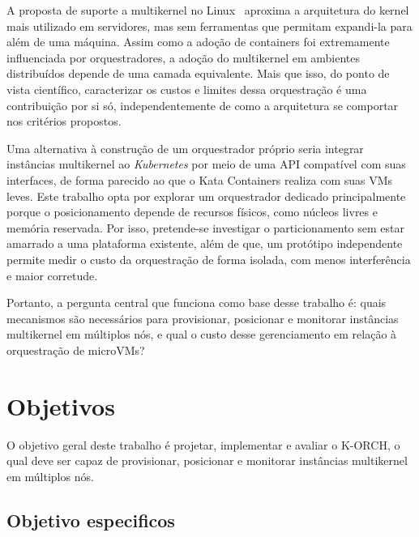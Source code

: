 \documentclass[12pt]{article}
\begin{document}
A proposta de suporte a multikernel no Linux~\cite{wang2025multikernel} aproxima a arquitetura
do kernel mais utilizado em servidores, mas sem ferramentas que permitam expandi-la para além de uma máquina.
Assim como a adoção de containers foi extremamente influenciada por orquestradores, a adoção do multikernel em ambientes distribuídos depende de uma
camada equivalente.
Mais que isso, do ponto de vista científico, caracterizar os custos e limites dessa orquestração é uma contribuição
por si só, independentemente de como a arquitetura se comportar nos critérios propostos.

Uma alternativa à construção de um orquestrador próprio seria integrar instâncias multikernel ao \textit{Kubernetes} por meio
de uma API compatível com suas interfaces, de forma parecido ao que o Kata Containers realiza com suas VMs leves.
Este trabalho opta por explorar um orquestrador dedicado principalmente porque o posicionamento depende de recursos físicos, como núcleos livres e
memória reservada.
Por isso, pretende-se investigar o particionamento sem estar amarrado a uma plataforma existente, além de que, um protótipo independente permite
medir o custo da orquestração de forma isolada, com menos interferência e maior corretude.

Portanto, a pergunta central que funciona como base desse trabalho é: quais mecanismos são necessários para provisionar, posicionar e monitorar instâncias multikernel
em múltiplos nós, e qual o custo desse gerenciamento em relação à orquestração de microVMs?

\section{Objetivos} \label{sec:objetivos}

O objetivo geral deste trabalho é projetar, implementar e avaliar o K-ORCH, o qual deve ser capaz de provisionar,
posicionar e monitorar instâncias multikernel em múltiplos nós.

\subsection{Objetivo especificos}\label{subsec:objetivo-especificos}
\end{document}
